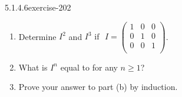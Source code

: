 \documentclass[twoside,10pt,]{book}
\numberwithin{equation}{section}
\begin{document}
\begin{divisionsolution}{5.1.4.6}{}{exercise-202}%
\hypertarget{p-1770}{}%
\leavevmode%
\begin{enumerate}[label=(\alph*)]
\item\hypertarget{li-932}{}\hypertarget{p-1771}{}%
Determine \(I^2\) and \(I^3 \text{ if }\) \(I = \left(
\begin{array}{ccc}
1 & 0 & 0 \\
0 & 1 & 0 \\
0 & 0 & 1 \\
\end{array}
\right)\).%
\item\hypertarget{li-933}{}\hypertarget{p-1772}{}%
What is \(I^n\) equal to for any \(n\geq 1\)?%
\item\hypertarget{li-934}{}\hypertarget{p-1773}{}%
Prove your answer to part (b) by induction.%
\end{enumerate}
%
\end{divisionsolution}%
\end{document}
